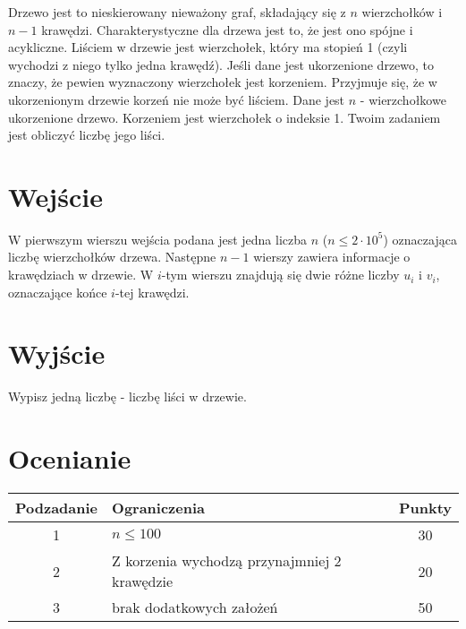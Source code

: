 \documentclass{spiral}
\begin{document}
    \makeheader

    Drzewo jest to nieskierowany nieważony graf,
    składający się z $n$ wierzchołków i $n-1$ krawędzi.
    Charakterystyczne dla drzewa jest to, że jest ono spójne i acykliczne.
    Liściem w drzewie jest wierzchołek, który ma stopień 1
    (czyli wychodzi z niego tylko jedna krawędź).
    Jeśli dane jest ukorzenione drzewo, to znaczy,
    że pewien wyznaczony wierzchołek jest korzeniem.
    Przyjmuje się, że w ukorzenionym drzewie korzeń nie może być liściem.
    Dane jest $n$ - wierzchołkowe ukorzenione drzewo.
    Korzeniem jest wierzchołek o indeksie 1.  
    Twoim zadaniem jest obliczyć liczbę jego liści.

\section{Wejście}

    W pierwszym wierszu wejścia podana jest jedna liczba $n$ ($n \leq 2 \cdot 10^5$)
    oznaczająca liczbę wierzchołków drzewa.
    Następne $n-1$ wierszy zawiera informacje o krawędziach w drzewie.
    W $i$-tym wierszu znajdują się dwie różne liczby $u_i$ i $v_i$,
    oznaczające końce $i$-tej krawędzi.

\section{Wyjście}

    Wypisz jedną liczbę - liczbę liści w drzewie.


\section{Ocenianie}

    \begin{center}
        \begin{tabular}{|c|p{5cm}|c|}
            \hline
            \textbf{Podzadanie} & \textbf{Ograniczenia} & \textbf{Punkty} \\
            \hline
            1 & $n \leq 100$ & 30 \\
            \hline
            2 & Z korzenia wychodzą przynajmniej 2 krawędzie & 20 \\
            \hline
            3 & brak dodatkowych założeń & 50 \\
            \hline
        \end{tabular}
    \end{center}
\end{document}
